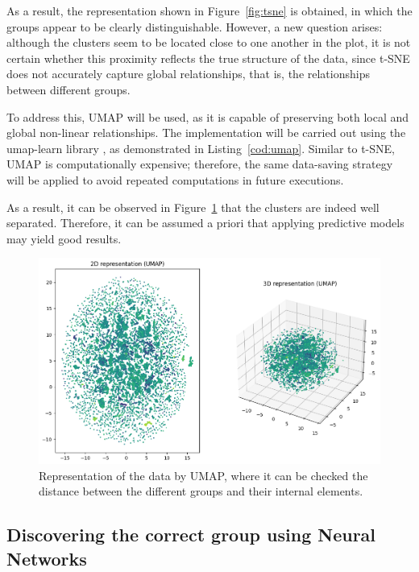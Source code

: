As a result, the representation shown in Figure~\ref{fig:tsne} is obtained, in which the groups appear to be clearly distinguishable. However, a new question arises: although the clusters seem to be located close to one another in the plot, it is not certain whether this proximity reflects the true structure of the data, since t-SNE does not accurately capture global relationships, that is, the relationships between different groups.

To address this, UMAP \cite{mcinnes2020umapuniformmanifoldapproximation} will be used, as it is capable of preserving both local and global non-linear relationships. The implementation will be carried out using the umap-learn library \cite{umap-docs}, as demonstrated in Listing~\ref{cod:umap}. Similar to t-SNE, UMAP is computationally expensive; therefore, the same data-saving strategy will be applied to avoid repeated computations in future executions.

As a result, it can be observed in Figure~\ref{fig:umap} that the clusters are indeed well separated. Therefore, it can be assumed a priori that applying predictive models may yield good results.

\begin{figure}[H]
    \centering
    \includegraphics[width=1\textwidth]{figures/data_representation/umap.png}
    \caption{Representation of the data by UMAP, where it can be checked the distance between the different groups and their internal elements.}
    \label{fig:umap}
\end{figure}


\subsection{Discovering the correct group using Neural Networks}


